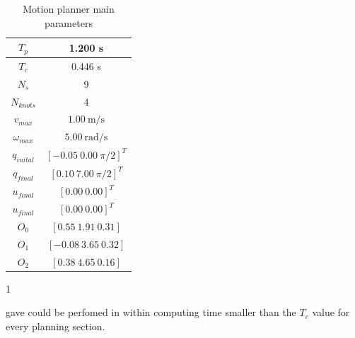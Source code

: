 \begin{table}[!h]
\caption {Motion planner main parameters} \label{tab:s3param}
\begin{center}
\begin{tabular}{|c|c|}
\hline
$T_p$ & 1.200 s\\
\hline 
$T_c$ & 0.446 s\\
\hline 
$N_s$ & 9\\
\hline 
$N_{knots}$ & 4\\
\hline
$v_{max}$ & $1.00\ \mathrm{m/s}$\\
\hline
$\omega_{max}$ & $5.00\ \mathrm{rad/s}$\\
\hline
$q_{inital}$ & $[-0.05\ 0.00\ \pi/2]^T$\\
\hline
$q_{final}$ & $[0.10\ 7.00\ \pi/2]^T$\\
\hline
$u_{final}$ & $[0.00\ 0.00]^T$\\
\hline
$u_{final}$ & $[0.00\ 0.00]^T$\\
\hline
$O_0$ & $[0.55\ 1.91\ 0.31]$\\
\hline
$O_1$ & $[-0.08\ 3.65\ 0.32]$\\
\hline
$O_2$ & $[0.38\ 4.65\ 0.16]$\\
\hline
\end{tabular}
\end{center}
\end{table}1

gave could be perfomed in within computing time smaller than the $T_c$ value for every planning section.

